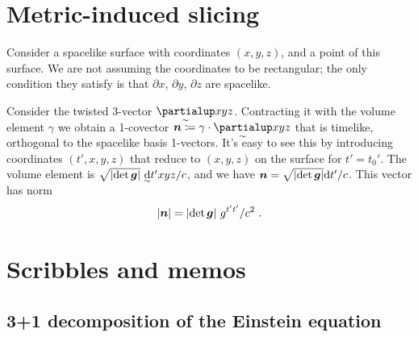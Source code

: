 \documentclass[\ifafour a4paper,12pt,\else a5paper,10pt,\fi%
onecolumn,oneside,article,%
british%
]{memoir}
\theoremstyle{remark}
\theoremstyle{innote}
\newcommand*{\de}{\partialup}%
\newcommand*{\di}{\mathrm{d}}%
\newcommand*{\defd}{\coloneqq}
\DeclarePairedDelimiter\abs{\lvert}{\rvert}
\renewcommand*{\|}[1][]{\nonscript\:#1\vert\nonscript\:\mathopen{}}
\newcommand*{\tw}[2][\scriptstyle\sim]{\smash[b]{\underset{\mathclap{{}^{#1}}}{#2}}}
\newcommand*{\ti}[1][\scriptstyle\sim]{\tw[#1]{\di}}
\newcommand*{\te}[1][\scriptstyle\sim]{\tw[#1]{\de}}
\begin{document}
\section{Metric-induced slicing}
\label{sec:metric_slicing}

Consider a spacelike surface with coordinates $(x,y,z)$, and a point of this surface. We are not assuming the coordinates to be rectangular; the only condition they satisfy is that $\de x$, $\de y$, $\de z$ are spacelike.

Consider the twisted 3-vector $\te xyz$. Contracting it with the volume element $\gamma$ we obtain a 1-covector $\bm{n}\defd \gamma \cdot \te xyz$ that is timelike, orthogonal to the spacelike basis 1-vectors. It's easy to see this by introducing coordinates $(t',x,y,z)$ that reduce to $(x,y,z)$ on the surface for $t'=t_{0}'$. The volume element is $\sqrt{\abs{\det\bm{g}}}\ \ti t'xyz/c$, and we have $\bm{n} = \sqrt{\abs{\det\bm{g}}} \di t'/c$. This vector has norm
\begin{equation*}
  \abs{\bm{n}} = \abs{\det\bm{g}}\ g^{t't'}/c^{2} \ .
\end{equation*}


\section{Scribbles and memos}
\label{sec:memos}

\subsection{3+1 decomposition of the Einstein equation}
\label{sec:31einstein}
\end{document}
